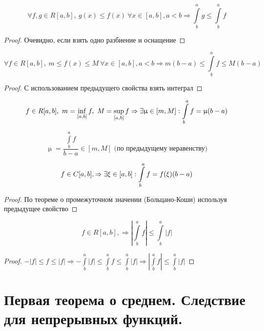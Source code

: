 \documentclass[11pt, fleqn]{article}
\begin{document}
\begin{Property}[3]
\begin{Property}[4]
\begin{Property}[2, аддитивность]
\begin{Property}[4]
    \[\forall f,g \in R[a,b],\ g(x) \leqslant f(x)\ \forall x \in [a,b], a<b \Rightarrow \int\limits^a_b g \leqslant \int\limits^a_b f\]
\end{Property}

\begin{proof}
    Очевидно, если взять одно разбиение и оснащение
\end{proof}

\begin{Property}[5]
    \[\forall f \in R[a,b],\ m \leqslant f(x) \leqslant M\ \forall x \in [a,b], a<b \Rightarrow m(b-a) \leqslant \int\limits^a_b f \leqslant M(b-a)\]
\end{Property}

\begin{proof}
    С использованием предыдущего свойства взять интеграл
\end{proof}

\begin{Property}[6]
    \[f \in R[a,b],\ m = \inf\limits_{[a,b]} f,\ M = \sup\limits_{[a,b]} f \Rightarrow \exists \upmu \in [m,M]: \int\limits^a_b f =\upmu (b-a)\]
\end{Property}

\begin{Proof}
    \[\upmu=\frac{\int\limits^a_b f}{b-a} \in [m,M] \text{ (по предыдущему неравенству)}\]
\end{Proof}

\begin{Property}[7]
    \[f \in C[a,b], \Rightarrow \exists \xi \in [a,b]: \int\limits^a_b f = f(\xi) (b-a)\]
\end{Property}

\begin{proof}
    По теореме о промежуточном значении (Больцано-Коши) используя предыдущее свойство
\end{proof}

\begin{Property}[8]
    \[f \in R[a,b], \Rightarrow |\int\limits^a_b f| \leqslant \int\limits^a_b |f|\]
\end{Property}

\begin{proof}
    $-|f| \leqslant f \leqslant |f| \Rightarrow -\int\limits^a_b |f| \leqslant \int\limits^a_b f \leqslant \int\limits^a_b |f| \Rightarrow |\int\limits^a_b f| \leqslant \int\limits^a_b |f|$
\end{proof}

\newpage
\section{Первая теорема о среднем. Следствие для непрерывных функций.}
 

\end{Property}
\end{Property}
\end{Property}
\end{document}
